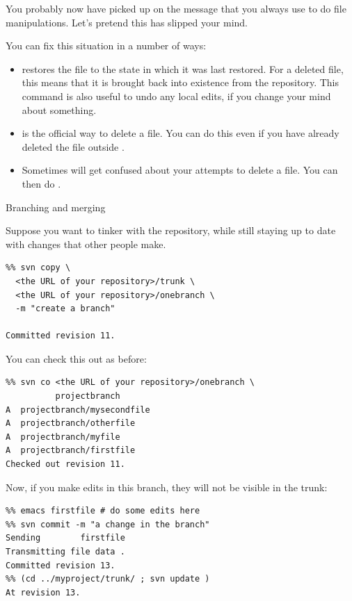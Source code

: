You probably now have picked up on the message that you always use
 to do file manipulations. Let's pretend this has slipped your
mind.


You can fix this situation in a number of ways:
\begin{itemize}
\item {} restores the file to the state in which it was
  last restored. For a deleted file, this means that it is brought
  back into existence from the repository. This command is also useful to
  undo any local edits, if you change your mind about something.
\item {} is the official way to delete a file. You
  can do this even if you have already deleted the file outside
  .
\item Sometimes  will get confused about your attempts to
  delete a file. You can then do .
\end{itemize}

 {Branching and merging}

Suppose you want to tinker with the repository, while still staying up
to date with changes that other people make.
\begin{verbatim}
%% svn copy \
  <the URL of your repository>/trunk \
  <the URL of your repository>/onebranch \
  -m "create a branch"

Committed revision 11.
\end{verbatim}
You can check this out as before:
\begin{verbatim}
%% svn co <the URL of your repository>/onebranch \
          projectbranch       
A  projectbranch/mysecondfile
A  projectbranch/otherfile
A  projectbranch/myfile
A  projectbranch/firstfile
Checked out revision 11.
\end{verbatim}

Now, if you make edits in this branch, they will not be visible in the
trunk:
\begin{verbatim}
%% emacs firstfile # do some edits here
%% svn commit -m "a change in the branch"
Sending        firstfile
Transmitting file data .
Committed revision 13.
%% (cd ../myproject/trunk/ ; svn update )
At revision 13.
\end{verbatim}

